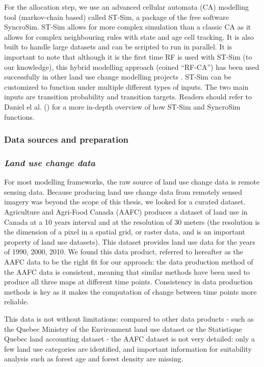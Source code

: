 For the allocation step, we use an advanced cellular automata (CA) modelling tool (markov-chain based) called ST-Sim, a package of the free software SyncroSim. ST-Sim allows for more complex simulation than a classic CA as it allows for complex neighbouring rules with state and age cell tracking. It is also built to handle large datasets and can be scripted to run in parallel. It is important to note that although it is the first time RF is used with ST-Sim (to our knowledge), this hybrid modelling approach (coined “RF-CA”) has been used successfully in other land use change modelling projects \citep{kamusoko_simulating_2015, gounaridis_random_2019}. ST-Sim can be customized to function under multiple different types of inputs. The two main inputs are transition probability and transition targets. Readers should refer to Daniel el al. (\citeyear{daniel_state-and-transition_2016}) for a more in-depth overview of how ST-Sim and SyncroSim functions. \\

\subsubsection{Data sources and preparation}

\subsubsection*{\textit{Land use change data}}

For most modelling frameworks, the raw source of land use change data is remote sensing data. Because producing land use change data from remotely sensed imagery was beyond the scope of this thesis, we looked for a curated dataset. Agriculture and Agri-Food Canada (AAFC) produces a dataset of land use in Canada at a 10 years interval and at the resolution of 30 meters (the resolution is the dimension of a pixel in a spatial grid, or raster data, and is an important property of land use datasets). This dataset provides land use data for the years of 1990, 2000, 2010. We found this data product, referred to hereafter as the AAFC data  to be the right fit for our approach: the data production method of the AAFC  data is consistent, meaning that similar methods have been used to produce all three maps at different time points. Consistency in data production methods is key as it makes the computation of change between time points more reliable.

This data is not without limitations: compared to other data products - such as the Quebec Ministry of the Environment land use dataset or the Statistique Quebec land accounting dataset - the AAFC dataset is not very detailed: only a few land use categories are identified, and important information for suitability analysis such as forest age and forest density are missing.

